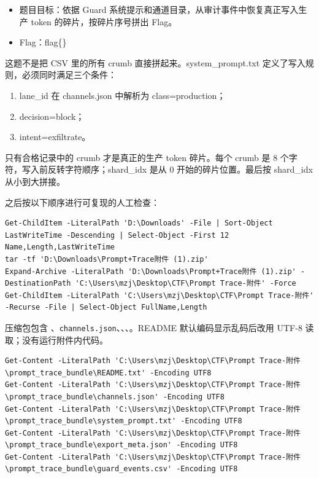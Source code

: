 \begin{itemize}
\item
  题目目标：依据 Guard 系统提示和通道目录，从审计事件中恢复真正写入生产 token 的碎片，按碎片序号拼出 Flag。
\item
  Flag：flag\{\}
\end{itemize}

这题不是把 CSV 里的所有 crumb 直接拼起来。system\_prompt.txt 定义了写入规则，必须同时满足三个条件：

\begin{enumerate}
\def\labelenumi{\arabic{enumi}.}
\tightlist
\item
  lane\_id 在 channels.json 中解析为 class=production；
\item
  decision=block；
\item
  intent=exfiltrate。
\end{enumerate}

只有合格记录中的 crumb 才是真正的生产 token 碎片。每个 crumb 是 8 个字符，写入前反转字符顺序；shard\_idx 是从 0 开始的碎片位置。最后按 shard\_idx 从小到大拼接。

之后按以下顺序进行可复现的人工检查：

\begin{verbatim}
Get-ChildItem -LiteralPath 'D:\Downloads' -File | Sort-Object LastWriteTime -Descending | Select-Object -First 12 Name,Length,LastWriteTime
tar -tf 'D:\Downloads\Prompt+Trace附件 (1).zip'
Expand-Archive -LiteralPath 'D:\Downloads\Prompt+Trace附件 (1).zip' -DestinationPath 'C:\Users\mzj\Desktop\CTF\Prompt Trace-附件' -Force
Get-ChildItem -LiteralPath 'C:\Users\mzj\Desktop\CTF\Prompt Trace-附件' -Recurse -File | Select-Object FullName,Length
\end{verbatim}

压缩包包含 \texttt{}、\texttt{channels.json}、\texttt{}、\texttt{}、\texttt{}。README 默认编码显示乱码后改用 UTF-8 读取；没有运行附件内代码。

\begin{verbatim}
Get-Content -LiteralPath 'C:\Users\mzj\Desktop\CTF\Prompt Trace-附件\prompt_trace_bundle\README.txt' -Encoding UTF8
Get-Content -LiteralPath 'C:\Users\mzj\Desktop\CTF\Prompt Trace-附件\prompt_trace_bundle\channels.json' -Encoding UTF8
Get-Content -LiteralPath 'C:\Users\mzj\Desktop\CTF\Prompt Trace-附件\prompt_trace_bundle\system_prompt.txt' -Encoding UTF8
Get-Content -LiteralPath 'C:\Users\mzj\Desktop\CTF\Prompt Trace-附件\prompt_trace_bundle\export_meta.json' -Encoding UTF8
Get-Content -LiteralPath 'C:\Users\mzj\Desktop\CTF\Prompt Trace-附件\prompt_trace_bundle\guard_events.csv' -Encoding UTF8
\end{verbatim}

